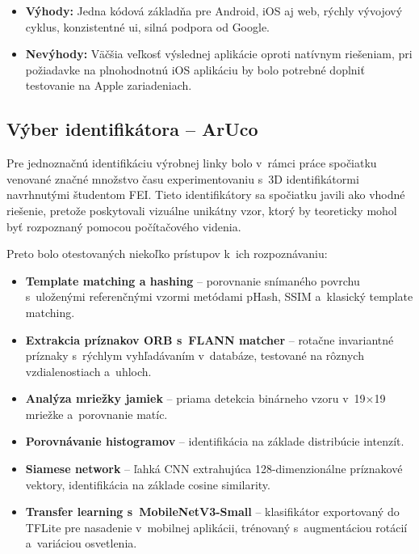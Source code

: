 \begin{itemize}
      \item \textbf{Výhody:} Jedna kódová základňa pre Android, iOS aj web, rýchly vývojový cyklus, konzistentné \acrshort{ui}, silná podpora od Google.
      \item \textbf{Nevýhody:} Väčšia veľkosť výslednej aplikácie oproti natívnym riešeniam, pri požiadavke na plnohodnotnú iOS aplikáciu by bolo potrebné doplniť testovanie na Apple zariadeniach.
\end{itemize}

\subsection{Výber identifikátora -- ArUco}

Pre jednoznačnú identifikáciu výrobnej linky bolo v~rámci práce spočiatku
venované značné množstvo času experimentovaniu s~3D identifikátormi
navrhnutými študentom FEI. Tieto identifikátory sa spočiatku javili ako vhodné
riešenie, pretože poskytovali vizuálne unikátny vzor, ktorý by teoreticky mohol
byť rozpoznaný pomocou počítačového videnia.

Preto bolo otestovaných niekoľko prístupov k~ich rozpoznávaniu:

\begin{itemize}
      \item \textbf{Template matching a hashing} -- porovnanie snímaného
            povrchu s~uloženými referenčnými vzormi metódami pHash, SSIM
            a~klasický template matching.
      \item \textbf{Extrakcia príznakov ORB s~FLANN matcher} -- rotačne
            invariantné príznaky s~rýchlym vyhľadávaním v~databáze,
            testované na rôznych vzdialenostiach a~uhloch.
      \item \textbf{Analýza mriežky jamiek} -- priama detekcia binárneho
            vzoru v~19$\times$19 mriežke a~porovnanie matíc.
      \item \textbf{Porovnávanie histogramov} -- identifikácia na základe
            distribúcie intenzít.
      \item \textbf{Siamese network} -- ľahká CNN extrahujúca
            128-dimenzionálne príznakové vektory, identifikácia
            na základe cosine similarity.
      \item \textbf{Transfer learning s~MobileNetV3-Small} -- klasifikátor
            exportovaný do TFLite pre nasadenie v~mobilnej aplikácii,
            trénovaný s~augmentáciou rotácií a~variáciou osvetlenia.
\end{itemize}

